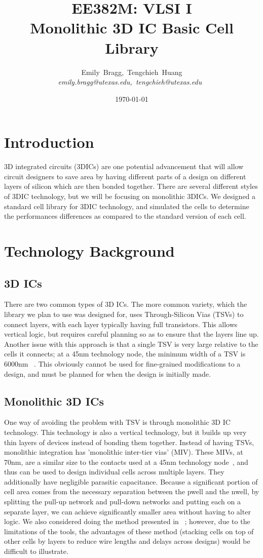 \documentclass{article}
\title{\vspace{30mm}EE382M: VLSI I \\ Monolithic 3D IC Basic Cell Library}
\author {
	Emily~Bragg,~Tengchieh~Huang\\
       	\em emily.bragg@utexas.edu,~tengchieh@utexas.edu\
}
\date{\today}
\begin{document}
\maketitle

\newpage
\section{Introduction}
3D integrated circuits (3DICs) are one potential advancement that will allow circuit designers to save area by having different parts of a design on different layers of silicon which are then bonded together. There are several different styles of 3DIC technology, but we will be focusing on monolithic 3DICs. We designed a standard cell library for 3DIC technology, and simulated the cells to determine the performances differences as compared to the standard version of each cell. 
\section{Technology Background}
\subsection{3D ICs} There are two common types of 3D ICs. The more common variety, which the library we plan to use was designed for, uses Through-Silicon Vias (TSVs) to connect layers, with each layer typically having full transistors. This allows vertical logic, but requires careful planning so as to ensure that the layers line up. Another issue with this approach is that a single TSV is very large relative to the cells it connects; at a 45nm technology node, the minimum width of a TSV is 6000nm ~\cite{NCSU}. This obviously cannot be used for fine-grained modifications to a design, and must be planned for when the design is initially made. 
\subsection{Monolithic 3D ICs} One way of avoiding the problem with TSV is through monolithic 3D IC technology. This technology is also a vertical technology, but it builds up very thin layers of devices instead of bonding them together. Instead of having TSVs, monolithic integration has 'monolithic inter-tier vias' (MIV). These MIVs, at 70nm, are a similar size to the contacts used at a 45nm technology node~\cite{ULTRA}, and thus can be used to design individual cells across multiple layers. They additionally have negligible parasitic capacitance. Because a significant portion of cell area comes from the necessary separation between the pwell and the nwell, by splitting the pull-up network and pull-down networks and putting each on a separate layer, we can achieve significantly smaller area without having to alter logic. We also considered doing the method presented in ~\cite{CELONCEL}; however, due to the limitations of the tools, the advantages of these method (stacking cells on top of other cells by layers to reduce wire lengths and delays across designs) would be difficult to illustrate.
\end{document}

